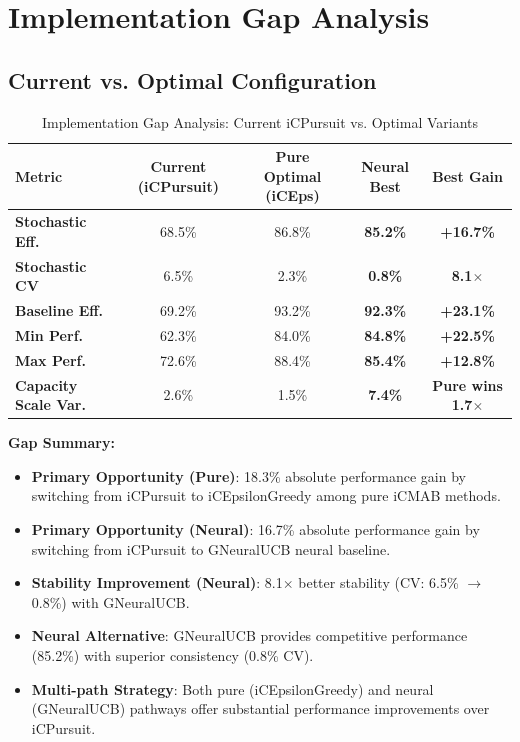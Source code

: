 \documentclass[12pt,a4paper]{article}
\newcommand{\success}[1]{\textcolor{accentgreen}{\textbf{#1}}}
\newcommand{\warning}[1]{\textcolor{warningred}{\textbf{#1}}}
\newcommand{\neural}[1]{\textcolor{neuralcolor}{\textbf{#1}}}
\begin{document}
\section{Implementation Gap Analysis}

\subsection{Current vs. Optimal Configuration}

\begin{table}[H]
\centering
\caption{Implementation Gap Analysis: Current iCPursuit vs. Optimal Variants}
\label{tab:implementation-gap}
\begin{tabular}{@{}lcccc@{}}
\toprule
\textbf{Metric} & \textbf{Current (iCPursuit)} & \textbf{Pure Optimal (iCEps)} & \textbf{Neural Best} & \textbf{Best Gain} \\
\midrule
\warning{Stochastic Eff.} & 68.5\% & 86.8\% & \neural{85.2\%} & \neural{+16.7\%} \\
\warning{Stochastic CV} & 6.5\% & 2.3\% & \neural{0.8\%} & \neural{8.1$\times$} \\
\warning{Baseline Eff.} & 69.2\% & 93.2\% & \neural{92.3\%} & \neural{+23.1\%} \\
\warning{Min Perf.} & 62.3\% & 84.0\% & \neural{84.8\%} & \neural{+22.5\%} \\
\warning{Max Perf.} & 72.6\% & 88.4\% & \neural{85.4\%} & \neural{+12.8\%} \\
\midrule
\warning{Capacity Scale Var.} & 2.6\% & 1.5\% & \neural{7.4\%} & \neural{Pure wins 1.7$\times$} \\
\bottomrule
\end{tabular}
\end{table}

\textbf{Gap Summary:}
\begin{itemize}
\item \warning{Primary Opportunity (Pure)}: 18.3\% absolute performance gain by switching from iCPursuit to iCEpsilonGreedy among pure iCMAB methods.
\item \warning{Primary Opportunity (Neural)}: 16.7\% absolute performance gain by switching from iCPursuit to GNeuralUCB neural baseline.
\item \warning{Stability Improvement (Neural)}: 8.1$\times$ better stability (CV: 6.5\% $\rightarrow$ 0.8\%) with GNeuralUCB.
\item \neural{Neural Alternative}: GNeuralUCB provides competitive performance (85.2\%) with superior consistency (0.8\% CV).
\item \success{Multi-path Strategy}: Both pure (iCEpsilonGreedy) and neural (GNeuralUCB) pathways offer substantial performance improvements over iCPursuit.
\end{itemize}
\end{document}
